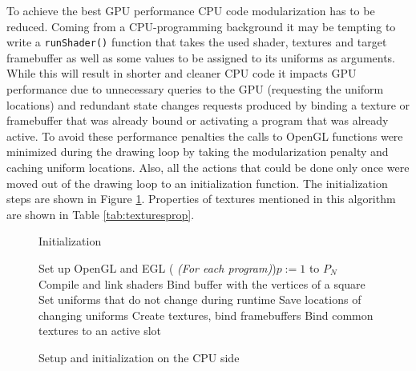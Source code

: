 \documentclass[conference]{IEEEtran}
\makeatletter
\newcommand{\removelatexerror}{\let\@latex@error\@gobble}
\makeatother
\begin{document}
To achieve the best GPU performance CPU code modularization has to be reduced. Coming from a CPU-programming background it may be tempting to write a \texttt{runShader()} function that takes the used shader, textures and target framebuffer as well as some values to be assigned to its uniforms as arguments. While this will result in shorter and cleaner CPU code it impacts GPU performance due to unnecessary queries to the GPU (requesting the uniform locations) and redundant state changes requests produced by binding a texture or framebuffer that was already bound or activating a program that was already active. To avoid these performance penalties the calls to OpenGL functions were minimized during the drawing loop by taking the modularization penalty and caching uniform locations. Also, all the actions that could be done only once were moved out of the drawing loop to an initialization function. The initialization steps are shown in Figure \ref{fig:alg:init}. Properties of textures mentioned in this algorithm are shown in Table \ref{tab:texturesprop}.

\begin{figure}[!t]
\removelatexerror
\begin{algorithm}[H]
\caption{Initialization}
	Set up OpenGL and EGL\;
	\For( \emph{(For each program)}){$p := 1$ to $P_{N}$}
	{
		Compile and link shaders\;
		Bind buffer with the vertices of a square\;
		Set uniforms that do not change during runtime\;
		Save locations of changing uniforms\;
	}
	Create textures, bind framebuffers\;
	Bind common textures to an active slot\;
\end{algorithm}
\caption{Setup and initialization on the CPU side}
\label{fig:alg:init}
\end{figure}
\end{document}
